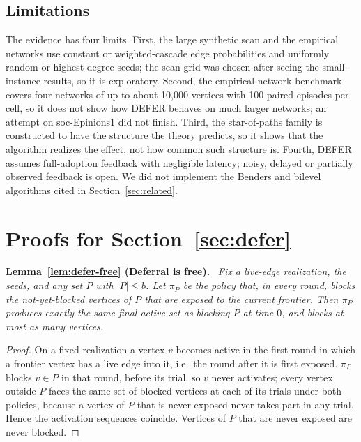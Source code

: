 \documentclass[preprint,11pt]{elsarticle}
\theoremstyle{definition}
\theoremstyle{remark}
\newenvironment{repeatlemma}[1][]{\par\medskip\noindent\textbf{#1.}\ \itshape}{\par\medskip}
\begin{document}
\subsection{Limitations}\label{sec:conclusion}

The evidence has four limits. First, the large synthetic scan and the empirical networks use constant or weighted-cascade edge probabilities and uniformly random or highest-degree seeds; the scan grid was chosen after seeing the small-instance results, so it is exploratory. Second, the empirical-network benchmark covers four networks of up to about 10,000 vertices with 100 paired episodes per cell, so it does not show how DEFER behaves on much larger networks; an attempt on soc-Epinions1 did not finish. Third, the star-of-paths family is constructed to have the structure the theory predicts, so it shows that the algorithm realizes the effect, not how common such structure is. Fourth, DEFER assumes full-adoption feedback with negligible latency; noisy, delayed or partially observed feedback is open. We did not implement the Benders and bilevel algorithms cited in Section~\ref{sec:related}.


\appendix
{}
\renewcommand{\thetable}{\Alph{section}.\arabic{table}}
\renewcommand{\thefigure}{\Alph{section}.\arabic{figure}}
\renewcommand{\theequation}{\Alph{section}.\arabic{equation}}
\section{Proofs for Section~\ref{sec:defer}}\label{ec:defer-proofs}

\begin{repeatlemma}[Lemma~\ref{lem:defer-free} (Deferral is free)]
Fix a live-edge realization, the seeds, and any set $P$ with $|P|\le b$. Let
$\pi_P$ be the policy that, in every round, blocks the not-yet-blocked
vertices of $P$ that are exposed to the current frontier. Then $\pi_P$
produces exactly the same final active set as blocking $P$ at time $0$, and
blocks at most as many vertices.
\end{repeatlemma}
\begin{proof}
On a fixed realization a vertex $v$ becomes active in the first round in
which a frontier vertex has a live edge into it, i.e.\ the round after it is
first exposed. $\pi_P$ blocks $v\in P$ in that round, before its trial, so
$v$ never activates; every vertex outside $P$ faces the same set of blocked
vertices at each of its trials under both policies, because a vertex of $P$
that is never exposed never takes part in any trial. Hence the activation
sequences coincide. Vertices of $P$ that are never exposed are never
blocked.
\end{proof}
\end{document}
